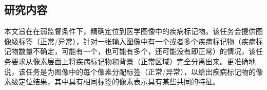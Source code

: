 \subsection{研究内容}
本文旨在在弱监督条件下，精确定位到医学图像中的疾病标记物。该任务会提供图像级标签（正常/异常），针对一张输入图像中有一个或者多个疾病标记物（疾病标记物数量不确定，可能有一个，也可能有多个，还可能没有即正常）的情况，该任务要求从像素层面上将疾病标记物和背景（正常区域）完全分离出来。更准确地说，该任务是为图像中的每个像素分配标签（正常/异常），以给出疾病标记物的像素级定位结果，其中具有相同标签的像素表示具有某些共同的特征。

